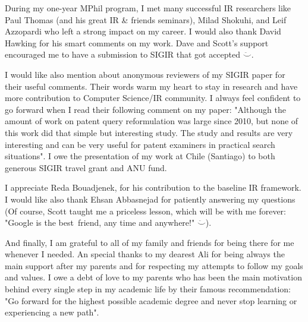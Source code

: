 During my one-year MPhil program, I met many successful IR researchers like Paul Thomas (and his great IR \& friends seminars), Milad Shokuhi, and Leif Azzopardi who left a strong impact on my career. I would also thank David Hawking for his smart comments on my work. Dave and Scott's support encouraged me to have a submission to SIGIR that got accepted $\ddot\smile$. 

I would like also mention about anonymous reviewers of my SIGIR paper  for their useful comments. Their words warm my heart to stay in research and have more contribution to Computer Science/IR community. I always feel confident to go forward when I read their following comment on my paper: "Although the amount of work on patent query reformulation was large since 2010, but none of this work did that simple but interesting study. The study and results are very interesting and can be very useful for patent examiners in practical search situations". I owe the presentation of my work at Chile (Santiago) to both generous SIGIR travel grant and ANU fund. 

I appreciate Reda Bouadjenek, for his contribution to the baseline IR framework. I would like also thank Ehsan Abbasnejad for patiently answering my questions (Of course, Scott taught me a priceless lesson, which will be with me forever: "Google is the best~friend, any time and anywhere!" $\ddot\smile$).

And finally, I am grateful to all of my family and friends for being there for me whenever I needed. An special thanks to my dearest Ali for being always the main support after my parents and for respecting my attempts to follow my goals and values. I owe a debt of love to my parents who has been the main motivation behind every single step in my academic life by their famous recommendation: "Go forward for the highest possible academic degree and never stop learning or experiencing a new path". 